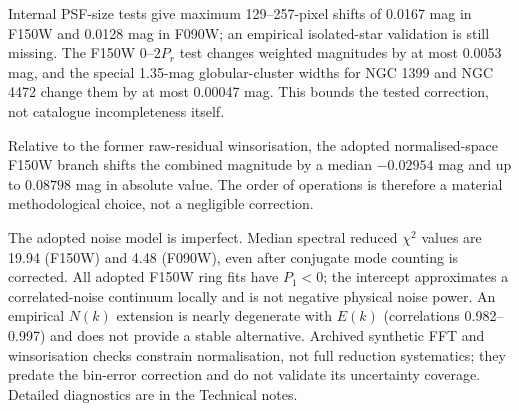 \documentclass[nodoi,nocopyright]{pas}
\begin{document}
Internal PSF-size tests give maximum 129--257-pixel shifts of 0.0167 mag
in F150W and 0.0128 mag in F090W; an empirical isolated-star validation
is still missing. The F150W $0$--$2P_r$ test changes weighted magnitudes
by at most 0.0053 mag, and the special 1.35-mag globular-cluster widths
for NGC 1399 and NGC 4472 change them by at most 0.00047 mag.
This bounds the tested correction, not catalogue incompleteness itself.

Relative to the former raw-residual winsorisation, the adopted
normalised-space F150W branch shifts the combined magnitude by a median
$-0.02954$ mag and up to $0.08798$ mag in absolute value. The order of
operations is therefore a material methodological choice, not a negligible
correction.

The adopted noise model is imperfect. Median spectral reduced
$\chi^2$ values are 19.94 (F150W) and 4.48 (F090W), even after conjugate
mode counting is corrected. All adopted F150W ring fits have $P_1<0$;
the intercept approximates a correlated-noise continuum locally and is
not negative physical noise power. An empirical $N(k)$ extension
is nearly degenerate with $E(k)$ (correlations 0.982--0.997) and
does not provide a stable alternative. Archived synthetic FFT and
winsorisation checks constrain normalisation, not full reduction
systematics; they predate the bin-error correction and do not validate
its uncertainty coverage. Detailed diagnostics are in the Technical notes.
\end{document}
